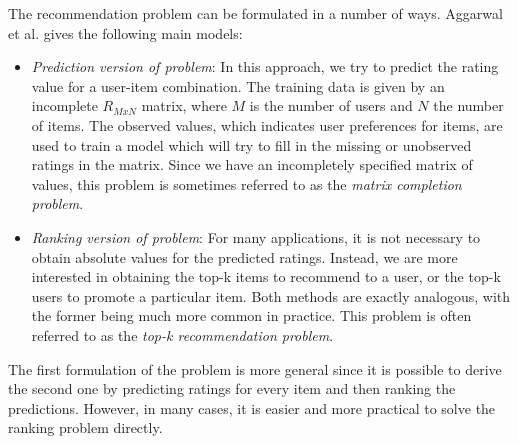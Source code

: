 \documentclass[cic,tc,english]{iiufrgs}
\begin{document}
The recommendation problem can be formulated in a number of ways. Aggarwal et al. \cite{Aggarwal2016} gives the following main models:
\begin{itemize}
\item \emph{Prediction version of problem}: In this approach, we try to predict the rating value for a user-item combination. The training data is given by an incomplete $R_{MxN}$ matrix, where $M$ is the number of users and $N$ the number of items. The observed values, which indicates user preferences for items, are used to train a model which will try to fill in the missing or unobserved ratings in the matrix. Since we have an incompletely specified matrix of values, this problem is sometimes referred to as the \textit{matrix completion problem}.
\item \emph{Ranking version of problem}: For many applications, it is not necessary to obtain absolute values for the predicted ratings. Instead, we are more interested in obtaining the top-k items to recommend to a user, or the top-k users to promote a particular item. Both methods are exactly analogous, with the former being much more common in practice. This problem is often referred to as the \textit{top-k recommendation problem}.
\end{itemize}

The first formulation of the problem is more general since it is possible to derive the second one by predicting ratings for every item and then ranking the predictions. However, in many cases, it is easier and more practical to solve the ranking problem directly.
\end{document}
